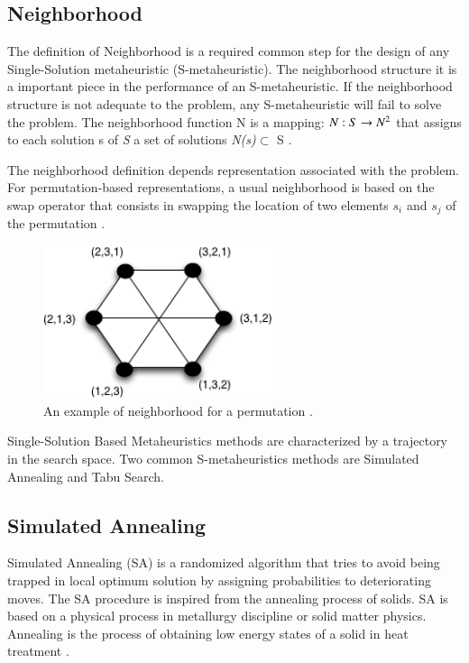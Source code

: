 \subsection{Neighborhood}

The definition of Neighborhood is a required common step for the design of any Single-Solution metaheuristic (S-metaheuristic). The neighborhood structure it is a important piece in the performance of an S-metaheuristic. If the neighborhood structure is not adequate to the problem,
any S-metaheuristic will fail to solve the problem. The neighborhood function N is a mapping: $ N : S \rightarrow N\textsuperscript{2} $ that assigns to each solution s of \textit{S} a set of solutions \textit{N(s)}$\subset$ S \cite{Talbi2013}.

The neighborhood definition depends  representation associated with the problem. For permutation-based representations, a usual neighborhood is based on the swap operator that consists in swapping the location of two elements $s_i$ and $s_j$ of the permutation \cite{Talbi2013}.


\begin{figure}[h]
\centering
\includegraphics[width=0.6\textwidth]{./images/neighborhood.png}
\caption{ An example of neighborhood for a permutation \cite{Talbi2013}.}
\label{fig:sperneighborhood}
\end{figure}



Single-Solution Based Metaheuristics methods are characterized by a trajectory in the search space. Two common S-metaheuristics methods are Simulated Annealing and Tabu Search.


\subsection{Simulated Annealing}

Simulated Annealing (SA) is a randomized algorithm that tries to avoid being trapped in local optimum solution by assigning probabilities to deteriorating moves. The SA procedure is inspired from the annealing process of solids. SA is based on a physical
process in metallurgy discipline or solid matter physics. Annealing is the process of obtaining low energy states of a solid in heat treatment \cite{Jaziri2008}. 

